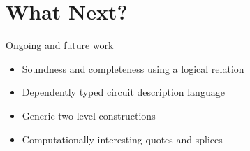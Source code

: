 \documentclass[aspectratio=169]{beamer}
\begin{document}
\section{What Next?}

\begin{frame}{Ongoing and future work}
  \begin{itemize}
    \item Soundness and completeness using a logical relation
    \item Dependently typed circuit description language
    \item Generic two-level constructions
    \item Computationally interesting quotes and splices
  \end{itemize}

\vfill

\end{frame}
\end{document}
